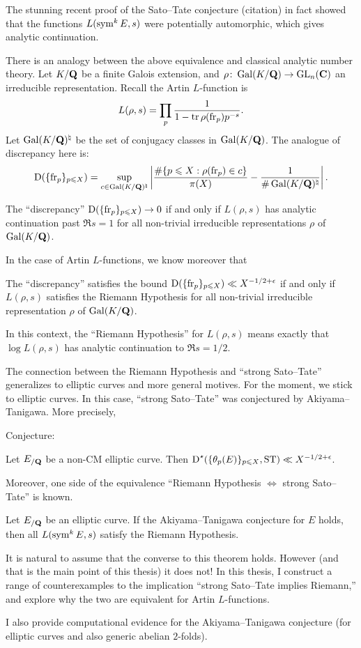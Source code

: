 The stunning recent proof of the Sato--Tate conjecture (citation) in fact 
showed that the functions $L(\operatorname{sym}^k E,s)$ were potentially automorphic, which 
gives analytic continuation. 

There is an analogy between the above equivalence and classical analytic number 
theory. Let $K/\mathbf{Q}$ be a finite Galois extension, and 
$\rho\colon \operatorname{Gal}(K/\mathbf{Q}) \to \operatorname{GL}_n(\mathbf{C})$ an irreducible representation. Recall 
the Artin $L$-function is 
\[
	L(\rho,s) = \prod_p \frac{1}{1-\operatorname{tr} \rho(\mathrm{fr}_p) p^{-s}} .
\]
Let $\operatorname{Gal}(K/\mathbf{Q})^\natural$ be the set of conjugacy classes in $\operatorname{Gal}(K/\mathbf{Q})$. 
The analogue of discrepancy here is: 
\[
	\operatorname{D}(\{\mathrm{fr}_p\}_{p\leqslant X}) = \sup_{c\in \operatorname{Gal}(K/\mathbf{Q})^\natural} \left| \frac{\# \{p\leqslant X : \rho(\mathrm{fr}_p) \in c\}}{\pi(X)} - \frac{1}{\# \operatorname{Gal}(K/\mathbf{Q})^\natural}\right| .
\]

\begin{theorem}
The ``discrepancy'' $\operatorname{D}(\{\mathrm{fr}_p\}_{p\leqslant X})\to 0$ if and only 
if $L(\rho,s)$ has analytic continuation past $\Re s=1$ for all non-trivial 
irreducible representations $\rho$ of $\operatorname{Gal}(K/\mathbf{Q})$. 
\end{theorem}

In the case of Artin $L$-functions, we know moreover that 

\begin{theorem}
The ``discrepancy'' satisfies the bound 
$\operatorname{D}(\{\mathrm{fr}_p\}_{p\leqslant X}) \ll X^{-1/2+\epsilon}$ if and only if 
$L(\rho,s)$ satisfies the Riemann Hypothesis for all non-trivial irreducible 
representation $\rho$ of $\operatorname{Gal}(K/\mathbf{Q})$. 
\end{theorem}

In this context, the ``Riemann Hypothesis'' for $L(\rho,s)$ means exactly that 
$\log L(\rho,s)$ has analytic continuation to $\Re s=1/2$. 

The connection between the Riemann Hypothesis and ``strong Sato--Tate'' 
generalizes to elliptic curves and more general motives. For the moment, we 
stick to elliptic curves. In this case, ``strong Sato--Tate'' was conjectured 
by Akiyama--Tanigawa. More precisely, 

Conjecture:

Let $E_{/\mathbf{Q}}$ be a non-CM elliptic curve. Then 
$\operatorname{D}^\star(\{\theta_p(E)\}_{p\leqslant X}, \mathrm{ST}) \ll X^{-1/2+\epsilon}$. 


Moreover, one side of the equivalence ``Riemann Hypothesis $\Leftrightarrow$ 
strong Sato--Tate'' is known. 

\begin{theorem}
Let $E_{/\mathbf{Q}}$ be an elliptic curve. If the Akiyama--Tanigawa conjecture for 
$E$ holds, then all $L(\operatorname{sym}^k E, s)$ satisfy the Riemann Hypothesis. 
\end{theorem}

It is natural to assume that the converse to this theorem holds. However (and 
that is the main point of this thesis) it does not! In this thesis, I construct 
a range of counterexamples to the implication ``strong Sato--Tate implies 
Riemann,'' and explore why the two are equivalent for Artin $L$-functions. 

I also provide computational evidence for the Akiyama--Tanigawa conjecture 
(for elliptic curves and also generic abelian $2$-folds). 
